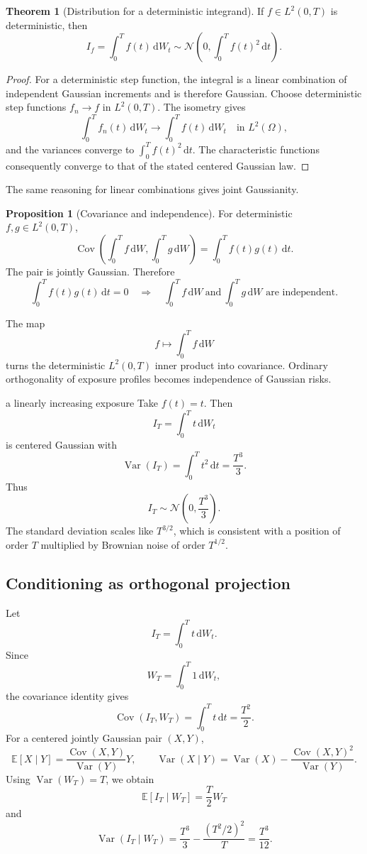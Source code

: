 \documentclass[10pt]{article}
\newcommand{\E}{\mathbb E}
\newcommand{\1}{\mathbf 1}
\newcommand{\dd}{\,\mathrm d}
\DeclareMathOperator{\Var}{Var}
\DeclareMathOperator{\Cov}{Cov}
\theoremstyle{definition}
\newtheorem{proposition}[definition]{Proposition}
\newtheorem{theorem}[definition]{Theorem}
\begin{document}
\begin{theorem}[Distribution for a deterministic integrand]
If \(f\in L^2(0,T)\) is deterministic, then
\[
I_f=\int_0^Tf(t)\dd W_t
\sim\mathcal N\left(0,\int_0^Tf(t)^2\dd t\right).
\]
\end{theorem}

\begin{proof}
For a deterministic step function, the integral is a linear combination of
independent Gaussian increments and is therefore Gaussian. Choose deterministic
step functions \(f_n\to f\) in \(L^2(0,T)\). The isometry gives
\[
\int_0^Tf_n(t)\dd W_t\longrightarrow
\int_0^Tf(t)\dd W_t
\quad\text{in }L^2(\Omega),
\]
and the variances converge to \(\int_0^Tf(t)^2\dd t\). The characteristic
functions consequently converge to that of the stated centered Gaussian law.
\end{proof}

The same reasoning for linear combinations gives joint Gaussianity.

\begin{proposition}[Covariance and independence]
For deterministic \(f,g\in L^2(0,T)\),
\[
\Cov\left(\int_0^Tf\dd W,\int_0^Tg\dd W\right)
=\int_0^Tf(t)g(t)\dd t.
\]
The pair is jointly Gaussian. Therefore
\[
\int_0^Tf(t)g(t)\dd t=0
\quad\Longrightarrow\quad
\int_0^Tf\dd W\ \text{and}\ \int_0^Tg\dd W
\text{ are independent}.
\]
\end{proposition}

The map
\[
f\longmapsto\int_0^Tf\dd W
\]
turns the deterministic \(L^2(0,T)\) inner product into covariance. Ordinary
orthogonality of exposure profiles becomes independence of Gaussian risks.

\begin{boardexample}{a linearly increasing exposure}
Take \(f(t)=t\). Then
\[
I_T=\int_0^Tt\dd W_t
\]
is centered Gaussian with
\[
\Var(I_T)=\int_0^Tt^2\dd t=\frac{T^3}{3}.
\]
Thus
\[
\boxed{I_T\sim\mathcal N\left(0,\frac{T^3}{3}\right).}
\]
The standard deviation scales like \(T^{3/2}\), which is consistent with a
position of order \(T\) multiplied by Brownian noise of order \(T^{1/2}\).
\end{boardexample}

\subsection{Conditioning as orthogonal projection}

Let
\[
I_T=\int_0^Tt\dd W_t.
\]
Since
\[
W_T=\int_0^T1\dd W_t,
\]
the covariance identity gives
\[
\Cov(I_T,W_T)=\int_0^Tt\dd t=\frac{T^2}{2}.
\]
For a centered jointly Gaussian pair \((X,Y)\),
\[
\E[X\mid Y]=\frac{\Cov(X,Y)}{\Var(Y)}Y,
\qquad
\Var(X\mid Y)=\Var(X)-\frac{\Cov(X,Y)^2}{\Var(Y)}.
\]
Using \(\Var(W_T)=T\), we obtain
\[
\boxed{\E[I_T\mid W_T]=\frac{T}{2}W_T}
\]
and
\[
\boxed{
\Var(I_T\mid W_T)
=\frac{T^3}{3}-\frac{(T^2/2)^2}{T}
=\frac{T^3}{12}.}
\]
\end{document}
